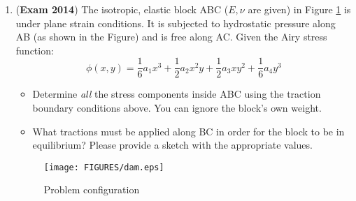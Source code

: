 \documentclass{article}
\newcommand{\ee}{\end{equation}}
\newcommand{\be}{\begin{equation}}
\newcommand{\bi}{\begin{itemize}}
\newcommand{\ei}{\end{itemize}}
\begin{document}
\begin{enumerate}
\item (\textbf{Exam 2014}) 
The isotropic, elastic block ABC  ($E,\nu$ are given) in Figure \ref{fig:dam} is under plane strain conditions. It is subjected to hydrostatic pressure  along AB (as shown in the Figure) and is free along AC.
Given the Airy stress function:
\be
\phi(x,y)= \frac{1}{6} a_1 x^3+ \frac{1}{2} a_2 x^2 y+ \frac{1}{2} a_3x y^2 +\frac{1}{6}a_4 y^3
\ee
\bi
\item Determine  {\em all} the stress components  inside ABC using the traction boundary conditions above. You can ignore the block's own weight.
\item What tractions must be applied along BC in order for the block to be in equilibrium? Please provide a sketch with the appropriate values.

\ei
\begin{figure}[th]
\centering \texttt{[image: FIGURES/dam.eps]}
\caption{ Problem configuration}
\label{fig:dam}
\end{figure}
\newpage

\end{enumerate}
\end{document}
